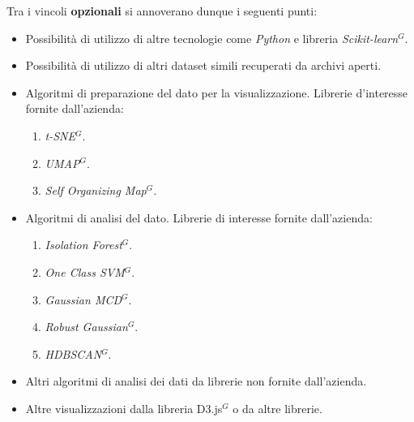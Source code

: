 \noindent Tra i vincoli \textbf{opzionali} si annoverano dunque i seguenti punti:
\begin{itemize}
\item Possibilità di utilizzo di altre tecnologie come \textit{Python} e libreria \textit{Scikit-learn$^{G}$}. 
\item Possibilità di utilizzo di altri dataset simili recuperati da archivi aperti.
\item Algoritmi di preparazione del dato per la visualizzazione. Librerie d'interesse fornite dall'azienda:
	\begin{enumerate}
                    \item \textit{t-SNE$^{G}$}.
                    \item \textit{UMAP$^{G}$}.
                    \item \textit{Self Organizing Map$^{G}$}.
	\end{enumerate}
\item Algoritmi di analisi del dato. Librerie di interesse fornite dall'azienda:
	\begin{enumerate}
                    \item \textit{Isolation Forest$^{G}$}.
                    \item \textit{One Class SVM$^{G}$}.
                    \item \textit{Gaussian MCD$^{G}$}.
                    \item \textit{Robust Gaussian$^{G}$}.
                    \item \textit{HDBSCAN$^{G}$}.
	\end{enumerate}
\item Altri algoritmi di analisi dei dati da librerie non fornite dall’azienda.
\item Altre visualizzazioni dalla libreria D3.js$^{G}$ o da altre librerie.
\end{itemize}



